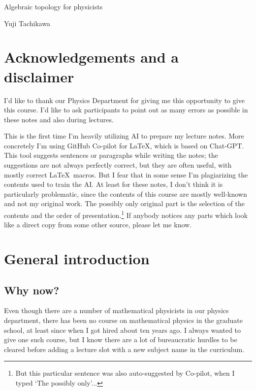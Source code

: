 \documentclass[12pt]{article}
\numberwithin{equation}{section}
\begin{document}
\centerline{\Large Algebraic topology for physicists}

\bigskip

\centerline{\large Yuji Tachikawa}

\setcounter{tocdepth}{2}
\tableofcontents

\newpage



\section*{Acknowledgements and a disclaimer}

I'd like to thank our Physics Department for giving me this opportunity to give this course.
I'd like to ask participants to point out as many errors as possible in these notes and also during lectures.

This is the first time I'm heavily utilizing AI to prepare my lecture notes.
More concretely I'm using GitHub Co-pilot for \LaTeX, which is based on Chat-GPT.
This tool suggests sentences or paragraphs while writing the notes;
the suggestions are not always perfectly correct, but they are often useful,
with mostly correct \LaTeX\ macros.
But I fear that in some sense I'm plagiarizing the contents used to train the AI.
At least for these notes, I don't think it is particularly problematic,
since the contents of this course are mostly well-known and not my original work.
The possibly only original part is the selection of the contents and the order of presentation.\footnote{%
But this particular sentence was also auto-suggested by Co-pilot, when I typed `The possibly only'...
}
If anybody notices any parts which look like a direct copy from some other source, please let me know.

\section{General introduction}

\subsection{Why now?}
\label{sec:whynow}

Even though there are a number of mathematical physicists in our physics department,
there has been no course on mathematical physics in the graduate school,
at least since when I got hired about ten years ago.
I always wanted to give one such course, but I know 
there are a lot of bureaucratic hurdles to be cleared before adding a lecture slot with a new subject name in the curriculum.
\end{document}
